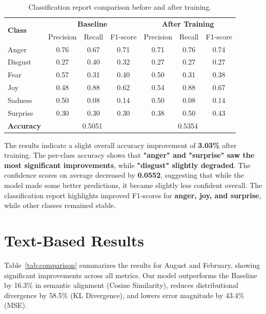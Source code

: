 \begin{table}[h]
    \centering
    \begin{tabular}{lccc|ccc}
        \hline
        \multirow{2}{*}{\textbf{Class}} & \multicolumn{3}{c|}{\textbf{Baseline}} & \multicolumn{3}{c}{\textbf{After Training}} \\
        & Precision & Recall & F1-score & Precision & Recall & F1-score \\
        \hline
        Anger & 0.76 & 0.67 & 0.71 & 0.71 & 0.76 & 0.74 \\
        Disgust & 0.27 & 0.40 & 0.32 & 0.27 & 0.27 & 0.27 \\
        Fear & 0.57 & 0.31 & 0.40 & 0.50 & 0.31 & 0.38 \\
        Joy & 0.48 & 0.88 & 0.62 & 0.54 & 0.88 & 0.67 \\
        Sadness & 0.50 & 0.08 & 0.14 & 0.50 & 0.08 & 0.14 \\
        Surprise & 0.30 & 0.30 & 0.30 & 0.38 & 0.50 & 0.43 \\
        \hline
        \textbf{Accuracy} & \multicolumn{3}{c|}{0.5051} & \multicolumn{3}{c}{0.5354} \\
        \hline
    \end{tabular}
    \caption{Classification report comparison before and after training.}
    \label{tab:classification_report}
\end{table}

The results indicate a slight overall accuracy improvement of \textbf{3.03\%} after training. The per-class accuracy shows that \textbf{"anger" and "surprise" saw the most significant improvements}, while \textbf{"disgust" slightly degraded}. The confidence scores on average decreased by \textbf{0.0552}, suggesting that while the model made some better predictions, it became slightly less confident overall. The classification report highlights improved F1-scores for \textbf{anger, joy, and surprise}, while other classes remained stable.




\section{Text-Based Results}
\label{sec:text-results}

Table~\ref{tab:comparison} summarizes the results for August and February, showing significant improvements across all metrics. Our model outperforms the Baseline by 16.3\% in semantic alignment (Cosine Similarity), reduces distributional divergence by 58.5\% (KL Divergence), and lowers error magnitude by 43.4\% (MSE).

